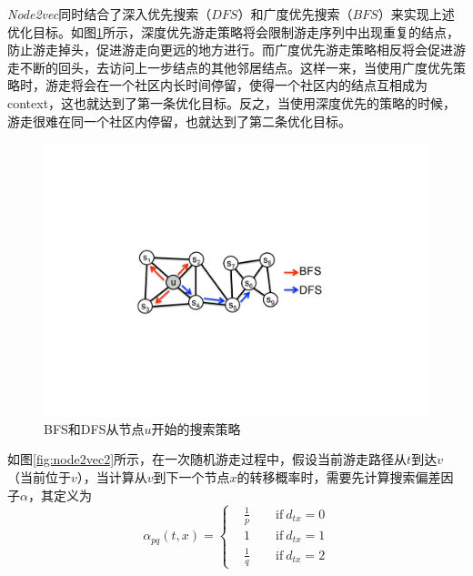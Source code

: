 \emph{Node2vec}同时结合了深入优先搜索（$DFS$）和广度优先搜索（$BFS$）来实现上述优化目标。如图\ref{fig:node2vec1}所示，深度优先游走策略将会限制游走序列中出现重复的结点，防止游走掉头，促进游走向更远的地方进行。而广度优先游走策略相反将会促进游走不断的回头，去访问上一步结点的其他邻居结点。这样一来，当使用广度优先策略时，游走将会在一个社区内长时间停留，使得一个社区内的结点互相成为context，这也就达到了第一条优化目标。反之，当使用深度优先的策略的时候，游走很难在同一个社区内停留，也就达到了第二条优化目标。

\begin{figure}[!htbp]
	\centering
	\includegraphics[scale=1]{Fig/Node2Vec_1.pdf}
	\caption{BFS和DFS从节点$u$开始的搜索策略\cite{grover2016node2vec}}
	\label{fig:node2vec1}
\end{figure}

如图\ref{fig:node2vec2}所示，在一次随机游走过程中，假设当前游走路径从$t$到达$v$（当前位于$v$），当计算从$v$到下一个节点$x$的转移概率时，需要先计算搜索偏差因子$\alpha$，其定义为
\[\alpha_{pq}(t, x)=\begin{cases} & \frac1p \qquad \text{if}\ d_{tx} = 0\\
  & 1 \qquad \text{if}\ d_{tx} = 1\\
& \frac1q \qquad \text{if}\ d_{tx} = 2\end{cases}\]

